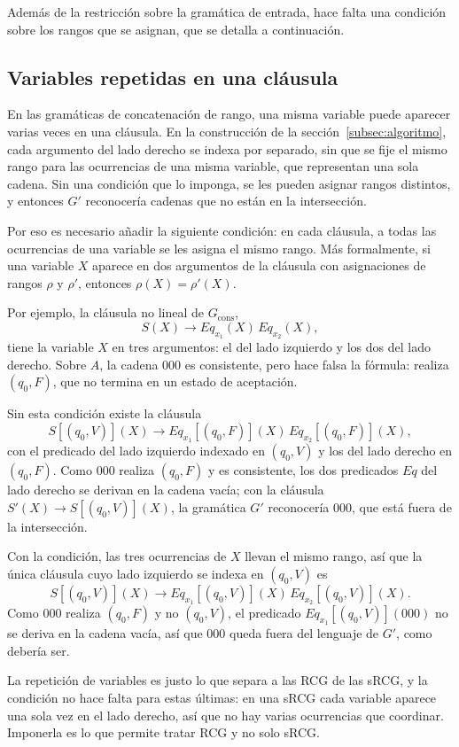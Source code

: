 Además de la restricción sobre la gramática de entrada, hace falta una
condición sobre los rangos que se asignan, que se detalla a
continuación.

\subsection{Variables repetidas en una cláusula}

En las gramáticas de concatenación de rango, una misma variable puede
aparecer varias veces en una cláusula. En la construcción de la
sección~\ref{subsec:algoritmo}, cada argumento del lado derecho se indexa por
separado,
sin que se fije el mismo rango para las ocurrencias de una misma
variable, que representan una sola cadena.
Sin una condición que lo imponga, se les pueden asignar rangos
distintos, y entonces $G'$ reconocería cadenas que no están en la
intersección.

Por eso es necesario añadir la siguiente condición: en cada cláusula,
a todas las ocurrencias de una variable se les asigna el mismo rango.
Más formalmente, si una variable $X$ aparece en dos argumentos de la
cláusula con asignaciones de rangos $\rho$ y $\rho'$, entonces
$\rho(X) = \rho'(X)$.

Por ejemplo, la cláusula no lineal de $G_{\mathrm{cons}}$,
\[
  S(X) \to Eq_{x_1}(X)\, Eq_{x_2}(X),
\]
tiene la variable $X$ en tres argumentos: el del lado izquierdo y los
dos del lado derecho. Sobre $A$, la cadena $000$ es consistente, pero
hace falsa la fórmula: realiza $(q_0, F)$, que no termina en un estado
de aceptación.

Sin esta condición existe la cláusula
\[
  S[(q_0, V)](X) \to Eq_{x_1}[(q_0, F)](X)\, Eq_{x_2}[(q_0, F)](X),
\]
con el predicado del lado izquierdo indexado en $(q_0, V)$ y los del
lado derecho en $(q_0, F)$. Como $000$ realiza $(q_0, F)$ y es
consistente, los dos predicados $Eq$ del lado derecho se derivan en la
cadena vacía; con la cláusula $S'(X) \to S[(q_0, V)](X)$, la gramática
$G'$ reconocería $000$, que está fuera de la intersección.

Con la condición, las tres ocurrencias de $X$ llevan el mismo rango, así
que la única cláusula cuyo lado izquierdo se indexa en $(q_0, V)$ es
\[
  S[(q_0, V)](X) \to Eq_{x_1}[(q_0, V)](X)\, Eq_{x_2}[(q_0, V)](X).
\]
Como $000$ realiza $(q_0, F)$ y no $(q_0, V)$, el predicado
$Eq_{x_1}[(q_0, V)](000)$ no se deriva en la cadena vacía, así que $000$
queda fuera del lenguaje de $G'$, como debería ser.

La repetición de variables es justo lo que separa a las RCG de las sRCG,
y la condición no hace falta para estas últimas: en una sRCG
cada variable aparece una sola vez en el lado derecho, así que no hay varias
ocurrencias que coordinar. Imponerla es lo que permite tratar RCG y no
solo sRCG.

